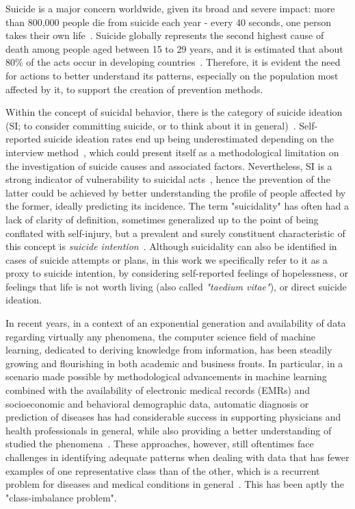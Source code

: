Suicide is a major concern worldwide, given its broad and severe impact: more than 800,000 people die from suicide each year - every 40 seconds, one person takes their own life~\cite{Reid2010a}.
Suicide globally represents the second highest cause of death among people aged between 15 to 29 years, and it is estimated that about 80\% of the acts occur in developing countries~\cite{WHO2017}.
Therefore, it is evident the need for actions to better understand its patterns, especially on the population most affected by it, to support the creation of prevention methods.

Within the concept of suicidal behavior, there is the category of suicide ideation (SI; to consider committing suicide, or to think about it in general)~\cite{Reid2010a}.
Self-reported suicide ideation rates end up being underestimated depending on the interview method~\cite{Spiers2014b}, which could present itself as a methodological limitation on the investigation of suicide causes and associated factors.
Nevertheless, SI is a strong indicator of vulnerability to suicidal acts~\cite{Bebbington2010}, hence the prevention of the latter could be achieved by better understanding the profile of people affected by the former, ideally predicting its incidence.
The term "suicidality" has often had a lack of clarity of definition, sometimes generalized up to the point of being conflated with self-injury, but a prevalent and surely constituent characteristic of this concept is \textit{suicide intention}~\cite{Carballo2020}.
Although suicidality can also be identified in cases of suicide attempts or plans, in this work we specifically refer to it as a proxy to suicide intention, by considering self-reported feelings of hopelessness, or feelings that life is not worth living (also called \textit{"taedium vitae"}), or direct suicide ideation.

In recent years, in a context of an exponential generation and availability of data regarding virtually any phenomena, the computer science field of machine learning, dedicated to deriving knowledge from information, has been steadily growing and flourishing in both academic and business fronts.
In particular, in a scenario made possible by methodological advancements in machine learning combined with the availability of electronic medical records (EMRs) and socioeconomic and behavioral demographic data, automatic diagnosis or prediction of diseases has had considerable success in supporting physicians and health professionals in general, while also providing a better understanding of studied the phenomena~\cite{Darcy2016}.
These approaches, however, still oftentimes face challenges in identifying adequate patterns when dealing with data that has fewer examples of one representative class than of the other, which is a recurrent problem for diseases and medical conditions in general~\cite{Burke2019}.
This has been aptly the "class-imbalance problem".

